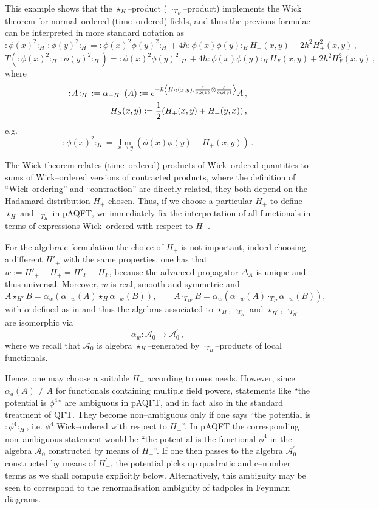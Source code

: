 \documentclass[10pt]{book}
\newcommand{\wick}[1]{:\!{#1}\!:}
\newcommand{\Acal}{\mathcal{A}}
\theoremstyle{break}
\begin{document}
This example shows that the $\star_H$--product ( $\cdot_{T_H}$--product) implements the Wick theorem for normal--ordered (time--ordered) fields, and thus the previous formulae can be interpreted in more standard notation as 
$$\wick{\phi(x)^2}_H\,\wick{\phi(y)^2}_H=\wick{\phi(x)^2\phi(y)^2}_H+4\hbar \wick{\phi(x)\phi(y)}_H H_+(x,y)+2\hbar^2 H^2_+(x,y)\,,$$
$$T\left(\wick{\phi(x)^2}_H\,\wick{\phi(y)^2}_H\right)=\wick{\phi(x)^2\phi(y)^2}_H+4\hbar \wick{\phi(x)\phi(y)}_H H_F(x,y)+2\hbar^2 H^2_F(x,y)\,,$$
where
\begin{eqnarray}
{\wick{A}}_H\,:=\alpha_{-H_+}(A):=e^{-\hbar\left\langle H_S(x,y),\frac{\delta}{\delta\phi(x)}\otimes \frac{\delta}{\delta\phi(y)}\right\rangle}A\,,\\
H_S(x,y) := \frac12 (H_+(x,y)+H_+(y,x))\,,\notag
\end{eqnarray}
e.g. $$\wick{\phi(x)^2}_H=\lim_{x\to y}\left(\phi(x)\phi(y)-H_+(x,y)\right)\,.$$

The Wick theorem relates (time--ordered) products of Wick--ordered quantities to sums of Wick--ordered versions of contracted products, where the definition of ``Wick--ordering'' and ``contraction'' are directly related, they both depend on the Hadamard distribution  $H_+$ chosen. Thus, if we choose a particular $H_+$ to define $\star_H$ and $\cdot_{T_H}$ in pAQFT, we immediately fix the interpretation of all functionals in terms of expressions Wick--ordered with respect to $H_+$.

For the algebraic formulation the choice of $H_+$ is not important, indeed choosing a different $H'_+$ with the same properties, one has that $w:=H'_+-H_+=H'_F-H_F$, because the advanced propagator $\Delta_A$ is unique and thus universal. Moreover, $w$ is real, smooth and symmetric and
$$A\star_{H'}B=\alpha_w\left(\alpha_{-w}(A)\star_H\alpha_{-w}(B)\right),\qquad A\cdot_{T_{H'}}B=\alpha_w\left(\alpha_{-w}(A)\cdot_{T_H}\alpha_{-w}(B)\right),$$
with $\alpha$ defined as in %
and thus the algebras associated to $\star_H$, $\cdot_{T_H}$ and  $\star_{H^\prime}$, $\cdot_{T_{H^\prime}}$ are isomorphic via $$\alpha_{w}:\Acal_0\to \Acal^\prime_0\,,$$ where we recall that $\Acal_0$ is algebra $\star_H$--generated by $\cdot_{T_H}$--products of local functionals.

Hence, one may choose a suitable $H_+$ according to ones needs. However, since $\alpha_{d}(A)\neq A$ for functionals containing multiple field powers, statements like ``the potential is $\phi^4$'' are ambiguous in pAQFT, and in fact also in the standard treatment of QFT. They become non--ambiguous only if one says ``the potential is $\wick{\phi^4}_H$, i.e.  $\phi^4$ Wick--ordered with respect to $H_+$''. In pAQFT the corresponding non--ambiguous statement would be ``the potential is the functional $\phi^4$ in the algebra $\Acal_0$ constructed by means of $H_+$''. If one then passes to the algebra $\Acal^\prime_0$ constructed by means of $H^\prime_+$, the potential picks up quadratic and c--number terms as we shall compute explicitly below. Alternatively, this ambiguity may be seen to correspond to the renormalisation ambiguity of tadpoles in Feynman diagrams.
\end{document}
